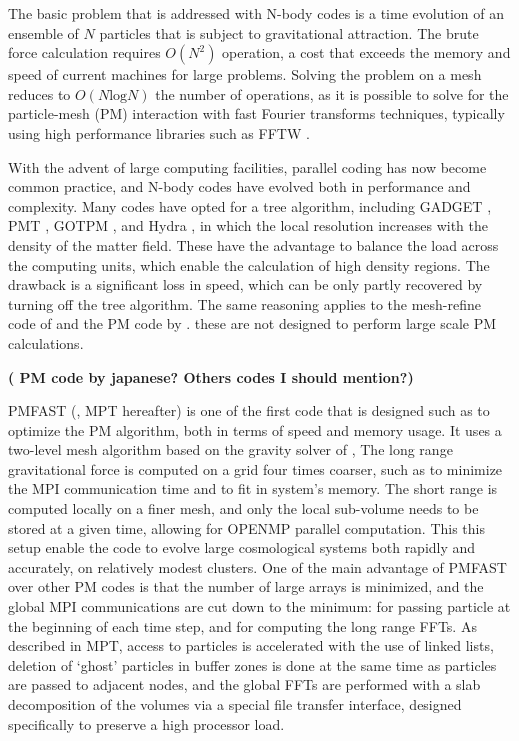 The basic problem that is addressed with N-body codes is a time evolution of an ensemble of $N$ particles
that is subject to gravitational attraction. The brute force calculation requires $O(N^{2})$ operation, a cost that 
exceeds the memory and speed of current machines for large problems.
Solving the problem  on a mesh \citep{1981csup.book.....H} reduces to $O(N\mbox{log}N)$ the number of operations,
as it is possible to solve for the particle-mesh (PM) interaction with fast Fourier transforms techniques, 
typically using high performance libraries such as {\small FFTW} \citep{FFTW3}.


With the advent of large computing facilities, parallel coding has now become 
common practice, and N-body codes have evolved both in performance and complexity. 
Many codes have opted for a tree algorithm, including {\small GADGET} \citep{2001NewA....6...79S, 2005MNRAS.364.1105S}, PMT \citep{1995ApJS...98..355X}, GOTPM \citep{2004NewA....9..111D}, and Hydra \citep{1995ApJ...452..797C}, in which the local resolution increases with the density of the matter field. 
These have the advantage to balance the load across the computing units, which enable the calculation of high density regions. 
The drawback is a significant loss in speed, which can be only partly recovered by turning off the tree algorithm. 
The same reasoning applies to the mesh-refine code of  \cite{1991ApJ...368L..23C} and the PM code by \cite{1995astro.ph..3042F}.
 these are not designed to perform large scale PM calculations. 

{\bf ( PM code by japanese? Others codes I should mention?)}


{\small PMFAST} (\cite{2005NewA...10..393M}, MPT hereafter) is one of the first code that is designed such as to optimize the PM algorithm,
both in terms of speed and memory usage. It uses a two-level mesh algorithm based on the gravity solver of \cite{2003AAS...203.9703T},
The long range gravitational force is computed on a  grid four times coarser, such as to minimize the {\small MPI} communication time
and to fit in system's memory. The short range is computed locally on a finer mesh, and only the local sub-volume needs 
to be stored at a given time, allowing for {\small OPENMP} parallel computation.
This this setup enable the code to evolve large cosmological systems both rapidly and accurately, on relatively modest clusters.
One of the main advantage of {\small PMFAST} over other PM codes is that the number of large arrays is minimized,
and the global {\small MPI} communications are cut down to the minimum: for passing particle at the beginning of each time step,
and  for computing the long range FFTs.
As described in MPT, access to particles is accelerated with the use of linked lists, deletion of `ghost' particles
in buffer zones is done at the same time as particles are passed to adjacent nodes,
and the global FFTs are performed with a slab decomposition of the volumes via a special file transfer interface, 
designed specifically to preserve a high processor load.

